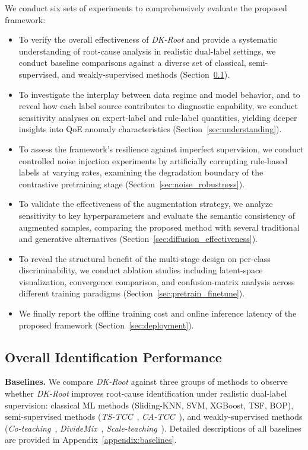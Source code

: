 \documentclass[lettersize,journal]{IEEEtran}
\begin{document}
We conduct six sets of experiments to comprehensively evaluate the proposed framework:
\begin{itemize}
    \item To verify the overall effectiveness of \textit{DK-Root} and provide a systematic understanding of root-cause analysis in realistic dual-label settings, we conduct baseline comparisons against a diverse set of classical, semi-supervised, and {\color{R3color}weakly-supervised} methods (Section~\ref{sec:rca_effectiveness}).
    \item {\color{R3color}To investigate the interplay between data regime and model behavior, and to reveal how each label source contributes to diagnostic capability, we conduct sensitivity analyses on expert-label and rule-label quantities, yielding deeper insights into QoE anomaly characteristics (Section~\ref{sec:understanding}).}
    \item {\color{R1color}To assess the framework's resilience against imperfect supervision, we conduct controlled noise injection experiments by artificially corrupting rule-based labels at varying rates, examining the degradation boundary of the contrastive pretraining stage (Section~\ref{sec:noise_robustness}).}
    \item {\color{R2color}To validate the effectiveness of the augmentation strategy, we analyze sensitivity to key hyperparameters and evaluate the semantic consistency of augmented samples, comparing the proposed method with several traditional and generative alternatives (Section~\ref{sec:diffusion_effectiveness}).}
    \item {\color{AEcolor}To reveal the structural benefit of the multi-stage design on per-class discriminability, we conduct ablation studies including latent-space visualization, convergence comparison, and confusion-matrix analysis across different training paradigms (Section~\ref{sec:pretrain_finetune}).}
    \item {\color{R2color} We finally report the offline training cost and online inference latency of the proposed framework (Section~\ref{sec:deployment}).}
\end{itemize}

\subsection{Overall Identification Performance}
\label{sec:rca_effectiveness}


\noindent\textbf{Baselines.}  
We compare \textit{DK-Root} against three groups of methods to observe whether \textit{DK-Root} improves root-cause identification under realistic dual-label supervision: classical ML methods (Sliding-KNN, SVM, XGBoost, TSF, BOP), semi-supervised methods (\textit{TS-TCC}~\cite{eldele2021time}, \textit{CA-TCC}~\cite{eldele2023self}), and {\color{R3color}weakly-supervised methods (\textit{Co-teaching}~\cite{han2018coteaching}, \textit{DivideMix}~\cite{li2020dividemix}, \textit{Scale-teaching}~\cite{liu2023scale})}. Detailed descriptions of all baselines are provided in Appendix~\ref{appendix:baselines}.
\end{document}
